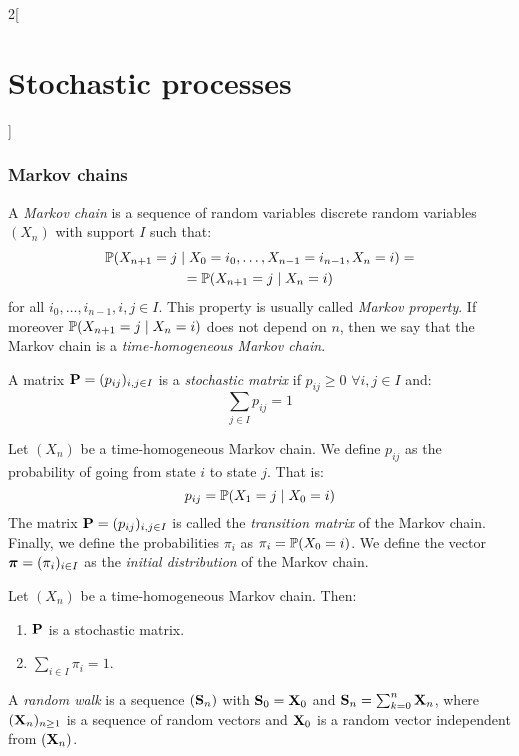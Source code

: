 \documentclass[../../../main_math.tex]{subfiles}
\begin{document}
\begin{multicols}{2}[\section{Stochastic processes}]
  \subsubsection{Markov chains}
  \begin{definition}
    A \emph{Markov chain} is a sequence of random variables discrete random variables $(X_n)$ with support $I$ such that:
    \begin{multline*}
      \mathbb{P}(X_{n+1}=j\mid X_0=i_0,\ldots,X_{n-1}=i_{n-1},X_n=i)=\\=\mathbb{P}(X_{n+1}=j\mid X_n=i)
    \end{multline*} for all $i_0,\ldots,i_{n-1},i,j\in I$. This property is usually called \emph{Markov property}.
    If moreover $\mathbb{P}(X_{n+1}=j\mid X_n=i)$ does not depend on $n$, then we say that the Markov chain is a \emph{time-homogeneous Markov chain}.
  \end{definition}
  \begin{definition}
    A matrix $\boldsymbol{\mathrm{P}}=(p_{ij})_{i,j\in I}$ is a \emph{stochastic matrix} if $p_{ij}\geq 0$ $\forall i,j\in I$ and: $$\sum_{j\in I}p_{ij}=1$$
  \end{definition}
  \begin{definition}
    Let $(X_n)$ be a time-homogeneous Markov chain. We define $p_{ij}$ as the probability of going from state $i$ to state $j$. That is: $$p_{ij}=\mathbb{P}(X_{1}=j\mid X_0=i)$$
    The matrix $\boldsymbol{\mathrm{P}}=(p_{ij})_{i,j\in I}$ is called the \emph{transition matrix} of the Markov chain. Finally, we define the probabilities $\pi_i$ as $\pi_i=\mathbb{P}(X_0=i)$. We define the vector $\boldsymbol{\mathrm{\pi}}=(\pi_i)_{i\in I}$ as the \emph{initial distribution} of the Markov chain.
  \end{definition}
  \begin{proposition}
    Let $(X_n)$ be a time-homogeneous Markov chain. Then:
    \begin{enumerate}
      \item $\boldsymbol{\mathrm{P}}$ is a stochastic matrix.
      \item $\sum_{i\in I}\pi_i=1$.
    \end{enumerate}
  \end{proposition}
  \begin{definition}
    A \emph{random walk} is a sequence $(\boldsymbol{\mathrm{S}}_n)$ with $\boldsymbol{\mathrm{S}}_0=\boldsymbol{\mathrm{X}}_0$ and $\boldsymbol{\mathrm{S}}_n=\sum_{k=0}^{n}\boldsymbol{\mathrm{X}}_n$, where $(\boldsymbol{\mathrm{X}}_n)_{n\geq 1}$ is a sequence of \iid random vectors and $\boldsymbol{\mathrm{X}}_0$ is a random vector independent from $(\boldsymbol{\mathrm{X}}_n)$.
  \end{definition}

\end{multicols}
\end{document}
